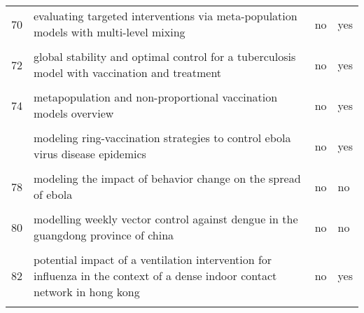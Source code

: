 \documentclass[
]{article}
\begin{document}
\begin{landscape}
\begin{longtable}{l>{\raggedright\arraybackslash}p{4cm}l>{\raggedright\arraybackslash}p{4cm}}
70 & evaluating targeted interventions via meta-population models with multi-level mixing & no & yes\\
\addlinespace
\cellcolor{gray!6}{71} & \cellcolor{gray!6}{evaluation of outbreak response immunization in the control of pertussis using agent-based modeling} & \cellcolor{gray!6}{no} & \cellcolor{gray!6}{yes}\\
72 & global stability and optimal control for a tuberculosis model with vaccination and treatment & no & yes\\
\cellcolor{gray!6}{73} & \cellcolor{gray!6}{impact on epidemic measles of vaccination campaigns triggered by disease outbreaks or serosurveys: a modeling study} & \cellcolor{gray!6}{no} & \cellcolor{gray!6}{yes}\\
74 & metapopulation and non-proportional vaccination models overview & no & yes\\
\cellcolor{gray!6}{75} & \cellcolor{gray!6}{model-based comprehensive analysis of school closure policies for mitigating influenza epidemics and pandemics} & \cellcolor{gray!6}{no} & \cellcolor{gray!6}{no}\\
\addlinespace
76 & modeling ring-vaccination strategies to control ebola virus disease epidemics & no & yes\\
\cellcolor{gray!6}{77} & \cellcolor{gray!6}{modeling the effect of public health resources and alerting on the dynamics of pertussis spread*} & \cellcolor{gray!6}{no} & \cellcolor{gray!6}{yes}\\
78 & modeling the impact of behavior change on the spread of ebola & no & no\\
\cellcolor{gray!6}{79} & \cellcolor{gray!6}{modeling the spread of polio in an ipv-vaccinated population: lessons learned from the 2013 silent outbreak in southern israel} & \cellcolor{gray!6}{no} & \cellcolor{gray!6}{yes}\\
80 & modelling weekly vector control against dengue in the guangdong province of china & no & no\\
\addlinespace
\cellcolor{gray!6}{81} & \cellcolor{gray!6}{optimal control strategies for the spread of ebola in west africa} & \cellcolor{gray!6}{no} & \cellcolor{gray!6}{no}\\
82 & potential impact of a ventilation intervention for influenza in the context of a dense indoor contact network in hong kong & no & yes\\
\cellcolor{gray!6}{83} & \cellcolor{gray!6}{predicting and evaluating the epidemic trend of ebola virus disease in the 2014-2015 outbreak and the effects of intervention measures} & \cellcolor{gray!6}{no} & \cellcolor{gray!6}{yes}\\

\end{longtable}
\end{landscape}
\end{document}
